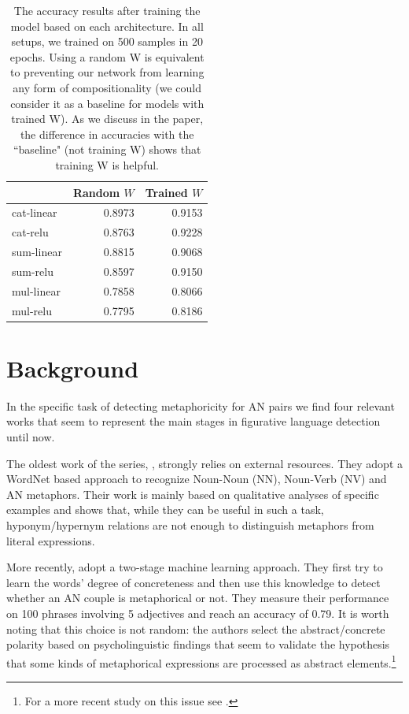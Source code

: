 \begin{table}[t]
	\centering
	\begin{tabular}{|l|r|r|}
	\hline
	{} &  \textbf{Random} $W$ &   \textbf{Trained} $W$ \\
	\hline
	cat-linear &  0.8973 &  0.9153 \\\hline
	cat-relu   &  0.8763 &  0.9228 \\\hline
	sum-linear &  0.8815 &  0.9068 \\\hline
	sum-relu   &  0.8597 &  0.9150 \\\hline
	mul-linear &  0.7858 &  0.8066 \\\hline
	mul-relu   &  0.7795 &  0.8186 \\\hline
	\end{tabular}
	\vspace{0.5em}
	\caption{\label{stylevar2017:tab:arch} The accuracy results after training the model based on each architecture. In all setups, we trained on 500 samples in 20 epochs. Using a random W is equivalent to preventing our network from learning any form of compositionality (we could consider it as a baseline for models with trained W). As we discuss in the paper, the difference in accuracies with the ``baseline" (not training W) shows that training W is helpful. }
\end{table}


\section{Background}

In the specific task of detecting metaphoricity for AN pairs we find four relevant works that seem to represent the main stages in figurative language detection until now. 

The oldest work of the series, \cite{Krishnakumaran:2007:HEM:1611528.1611531}, strongly relies on external resources. They adopt a WordNet based approach to recognize Noun-Noun (NN), Noun-Verb (NV) and AN metaphors.  Their work is mainly based on qualitative analyses of specific examples and shows that, while they can be useful in such a task, hyponym/hypernym relations  are not enough to distinguish metaphors from literal expressions. 

More recently, \citet{Turney:2011:LMS:2145432.2145511} adopt a two-stage machine learning approach. They first try to learn the words' degree of concreteness and then use this knowledge to detect whether an AN couple is metaphorical or not. They measure their performance on 100 phrases involving 5 adjectives and reach an accuracy of 0.79. It is worth noting that this choice is not random: the authors select the abstract/concrete polarity based on psycholinguistic findings that seem to validate the hypothesis that some kinds of metaphorical expressions are  processed as abstract elements.\footnote{For a more recent study on this issue see \cite{cogni15}.}

